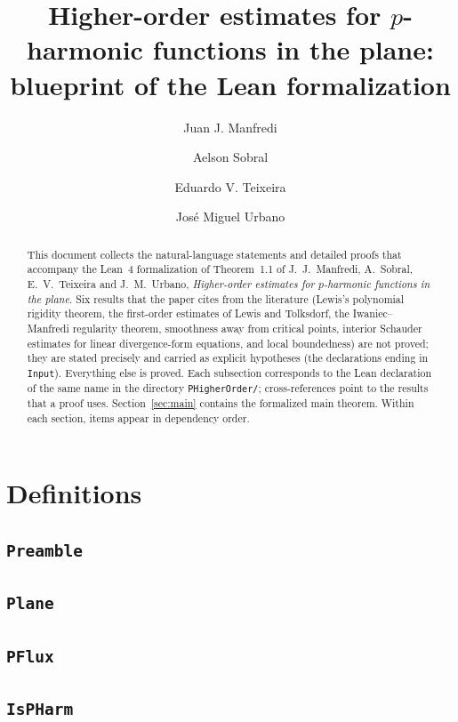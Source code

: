 \documentclass[11pt]{amsart}
\title[Blueprint of the Lean formalization]{Higher-order estimates for $p$-harmonic functions in the plane: blueprint of the Lean formalization}
\author{Juan J. Manfredi}
\author{Aelson Sobral}
\author{Eduardo V. Teixeira}
\author{Jos\'e Miguel Urbano}
\theoremstyle{definition}
\begin{document}
\begin{abstract}
This document collects the natural-language statements and detailed proofs that accompany the Lean~4 formalization of Theorem~1.1 of J.~J.~Manfredi, A.~Sobral, E.~V.~Teixeira and J.~M.~Urbano, \emph{Higher-order estimates for $p$-harmonic functions in the plane}.
Six results that the paper cites from the literature (Lewis's polynomial rigidity theorem, the first-order estimates of Lewis and Tolksdorf, the Iwaniec--Manfredi regularity theorem, smoothness away from critical points, interior Schauder estimates for linear divergence-form equations, and local boundedness) are not proved; they are stated precisely and carried as explicit hypotheses (the declarations ending in \texttt{Input}). Everything else is proved.
Each subsection corresponds to the Lean declaration of the same name in the directory \texttt{PHigherOrder/}; cross-references point to the results that a proof uses.
Section~\ref{sec:main} contains the formalized main theorem.
Within each section, items appear in dependency order.
\end{abstract}
\maketitle
\tableofcontents

\section{Definitions}
\subsection{\texorpdfstring{\texttt{Preamble}}{Preamble}}\label{node:Preamble}


\subsection{\texorpdfstring{\texttt{Plane}}{Plane}}\label{node:Plane}


\subsection{\texorpdfstring{\texttt{PFlux}}{PFlux}}\label{node:PFlux}


\subsection{\texorpdfstring{\texttt{IsPHarm}}{IsPHarm}}\label{node:IsPHarm}

\end{document}
